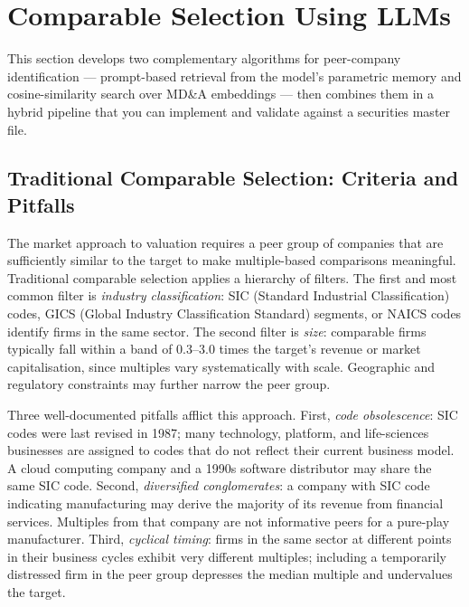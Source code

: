 
\section{Comparable Selection Using LLMs}
\label{sec:bv-comparables}

\begin{deepdive}
This section develops two complementary algorithms for peer-company identification ---
prompt-based retrieval from the model's parametric memory and cosine-similarity search
over MD\&A embeddings --- then combines them in a hybrid pipeline that you can implement
and validate against a securities master file.

\subsection{Traditional Comparable Selection: Criteria and Pitfalls}
\label{subsec:bv-comparables-traditional}

The market approach to valuation requires a peer group of companies that are
sufficiently similar to the target to make multiple-based comparisons meaningful.
Traditional comparable selection applies a hierarchy of filters. The first and
most common filter is \emph{industry classification}: SIC (Standard Industrial
Classification) codes, GICS (Global Industry Classification Standard) segments,
or NAICS codes identify firms in the same sector. The second filter is
\emph{size}: comparable firms typically fall within a band of 0.3--3.0 times
the target's revenue or market capitalisation, since multiples vary systematically
with scale. Geographic and regulatory constraints may further narrow the peer group.

Three well-documented pitfalls afflict this approach. First, \emph{code obsolescence}:
SIC codes were last revised in 1987; many technology, platform, and life-sciences
businesses are assigned to codes that do not reflect their current business model.
A cloud computing company and a 1990s software distributor may share the same
SIC code. Second, \emph{diversified conglomerates}: a company with SIC code
indicating manufacturing may derive the majority of its revenue from financial
services. Multiples from that company are not informative peers for a pure-play
manufacturer. Third, \emph{cyclical timing}: firms in the same sector at different
points in their business cycles exhibit very different multiples; including a
temporarily distressed firm in the peer group depresses the median multiple and
undervalues the target.


\end{deepdive}
